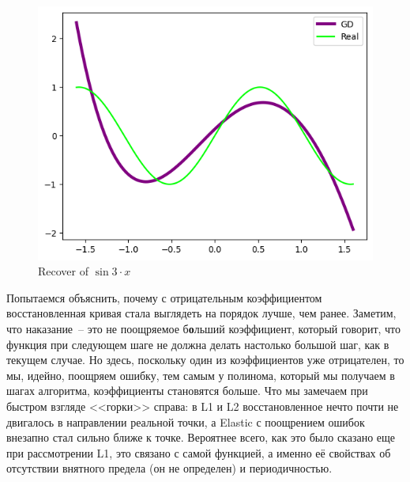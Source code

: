 \documentclass[12pt, a4paper, oneside, final]{article}
\begin{document}
	\begin{figure}[H]
		\centering
		\includegraphics[scale = 1]{Image/AT2_ELASTIC_RECOVER.png}
		\caption*{Recover of $\sin{3 \cdot x}$}
	\end{figure}
	Попытаемся объяснить, почему с отрицательным коэффициентом восстановленная кривая стала выглядеть на порядок лучше, чем ранее.
	Заметим, что наказание~-- это не поощряемое б\textbf{о}льший коэффициент, который говорит, что функция при следующем шаге не должна делать настолько большой шаг, как в текущем случае.
	Но здесь, поскольку один из коэффициентов уже отрицателен, то мы, идейно, поощряем ошибку, тем самым у полинома, который мы получаем в шагах алгоритма, коэффициенты становятся больше.
	Что мы замечаем при быстром взгляде <<горки>> справа: в L1 и L2 восстановленное нечто почти не двигалось в направлении реальной точки, а Elastic с поощрением ошибок внезапно стал сильно ближе к точке.
	Вероятнее всего, как это было сказано еще при рассмотрении L1, это связано с самой функцией, а именно её свойствах об отсутствии внятного предела (он не определен) и периодичностью.
\end{document}
